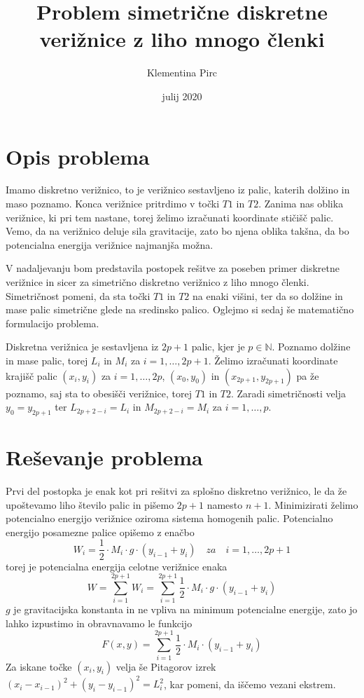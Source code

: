 \documentclass[A4paper, 11pt]{article}
\title{Problem simetrične diskretne verižnice z liho mnogo členki}
\author{Klementina Pirc}
\affil{Fakulteta za matematiko in fiziko \\ Oddelek za matematiko}
\date{julij 2020}
\begin{document}
\begin{titlepage} 

\maketitle
\thispagestyle{empty}
	
\end{titlepage}



\section{Opis problema}

Imamo diskretno verižnico, to je verižnico sestavljeno iz palic, katerih dolžino in maso poznamo. Konca verižnice pritrdimo v točki $T1$ in $T2$. Zanima nas oblika verižnice, ki pri tem nastane, torej želimo izračunati koordinate stičišč palic. Vemo, da na verižnico deluje sila gravitacije, zato bo njena oblika takšna, da bo potencialna energija verižnice najmanjša možna. 


V nadaljevanju bom predstavila postopek rešitve za poseben primer diskretne verižnice in sicer za simetrično diskretno verižnico z liho mnogo členki. Simetričnost pomeni, da sta točki $T1$ in $T2$ na enaki višini, ter da so dolžine in mase palic simetrične glede na sredinsko palico. Oglejmo si sedaj še matematično formulacijo problema.

Diskretna verižnica je sestavljena iz $2p+1$ palic, kjer je $p \in \mathbb{N}$. Poznamo dolžine in mase palic, torej $L_i$ in $M_i$ za $i=1, \ldots, 2p+1$. Želimo izračunati koordinate krajišč palic $(x_i,y_i)$ za $i=1, \ldots, 2p$, $(x_0,y_0)$ in $(x_{2p+1},y_{2p+1})$ pa že poznamo, saj sta to obesišči verižnice, torej $T1$ in $T2$. Zaradi simetričnosti velja $y_0 = y_{2p+1}$ ter $L_{2p+2-i} = L_i$ in $M_{2p+2-i} = M_i$ za $i=1, \ldots, p$.




\section{Reševanje problema}

Prvi del postopka je enak kot pri rešitvi za splošno diskretno verižnico, le da že upoštevamo liho število palic in pišemo $2p+1$ namesto $n+1$. 
Minimizirati želimo potencialno energijo verižnice oziroma sistema homogenih palic. Potencialno energijo posamezne palice opišemo z enačbo
\[ W_i = \frac{1}{2} \cdot M_i \cdot g \cdot (y_{i-1} + y_i) \quad za \quad i=1, \ldots, 2p+1 \]
torej je potencialna energija celotne verižnice enaka
\[ W = \sum_{i=1}^{2p+1} W_i = \sum_{i=1}^{2p+1} \frac{1}{2} \cdot M_i \cdot g \cdot (y_{i-1} + y_i) \]
$g$ je gravitacijska konstanta in ne vpliva na minimum potencialne energije, zato jo lahko izpustimo in obravnavamo le funkcijo
\[ F(x,y) = \sum_{i=1}^{2p+1} \frac{1}{2} \cdot M_i \cdot (y_{i-1} + y_i) \]
Za iskane točke $(x_i,y_i)$ velja še Pitagorov izrek $(x_i - x_{i-1})^2 + (y_i - y_{i-1})^2 = L_i ^2$, kar pomeni, da iščemo vezani ekstrem. 
\end{document}
